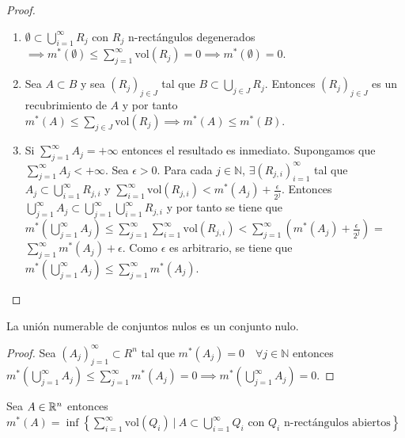 \begin{proof}
    \leavevmode
    \begin{enumerate}
        \item $\emptyset \subset \bigcup_{i=1}^\infty R_j$ con $R_j$ n-rectángulos degenerados $\implies m^*(\emptyset) \leq \sum_{j=1}^\infty \text{vol}(R_j) = 0 \implies m^*(\emptyset) = 0$.
        \item Sea $A \subset B$ y sea $(R_j)_{j \in J}$ tal que $B \subset \bigcup_{j \in J}
                  R_j$. Entonces $(R_j)_{j \in J}$ es un recubrimiento de $A$ y por tanto $m^*(A)
                  \leq \sum_{j \in J} \text{vol}(R_j) \implies m^*(A) \leq m^*(B)$.
        \item Si $\sum_{j=1}^{\infty}{A_j} = +\infty$ entonces el resultado es inmediato.
              Supongamos que $\sum_{j=1}^{\infty}{A_j} < +\infty$. Sea $\epsilon > 0$. Para
              cada $j \in \mathbb{N}$, $\exists (R_{j,i})_{i = 1}^\infty$ tal que $A_j
                  \subset \bigcup_{i = 1}^\infty R_{j,i}$ y $\sum_{i = 1}^\infty
                  \text{vol}(R_{j,i}) < m^*(A_j) + \frac{\epsilon}{2^j}$. Entonces
              $\bigcup_{j=1}^{\infty} A_j \subset \bigcup_{j=1}^{\infty} \bigcup_{i =
                      1}^\infty R_{j,i}$ y por tanto se tiene que $m^*(\bigcup_{j=1}^{\infty} A_j)
                  \leq \sum_{j=1}^{\infty} \sum_{i = 1}^\infty \text{vol}(R_{j,i}) <
                  \sum_{j=1}^{\infty} (m^*(A_j) + \frac{\epsilon}{2^j})$ = $\sum_{j=1}^{\infty}
                  m^*(A_j) + \epsilon$. Como $\epsilon$ es arbitrario, se tiene que
              $m^*(\bigcup_{j=1}^{\infty} A_j) \leq \sum_{j=1}^{\infty} m^*(A_j)$.
    \end{enumerate}
\end{proof}

\begin{corolario}
    La unión numerable de conjuntos nulos es un conjunto nulo.
\end{corolario}

\begin{proof}
    Sea $(A_j)_{j=1}^\infty \subset R^n$ tal que $m^*(A_j) = 0 \quad \forall j \in \mathbb{N}$ entonces $m^*(\bigcup_{j=1}^\infty A_j) \leq \sum_{j=1}^\infty m^*(A_j) = 0 \implies m^*(\bigcup_{j=1}^\infty A_j) = 0$.
\end{proof}

\begin{lema}
    Sea $A \in \mathbb{R}^n$ entonces $m^*(A) = \inf \left\{ \sum_{i=1}^\infty \text{vol}(Q_i) \ | \ A \subset \bigcup_{i=1}^\infty Q_i \text{ con } Q_i \text{ n-rectángulos abiertos} \right\}$
\end{lema}

